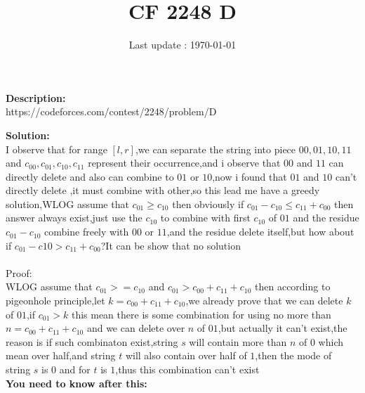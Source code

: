 \documentclass{article}
\begin{document}
\title{\textbf{CF 2248 D}}
\author{}
\date{Last update : \today}

\maketitle

\noindent \textbf{Description:}\\
https://codeforces.com/contest/2248/problem/D

\noindent \textbf{Solution:}\\
I observe that for range $[l,r]$,we can separate the string into piece $00,01,10,11$ and $c_{00},c_{01},c_{10},c_{11}$ represent their occurrence,and i observe that $00$ and $11$ can directly delete and also can combine to $01$ or $10$,now i found that $01$ and $10$ can't directly delete ,it must combine with other,so this lead me have a greedy solution,WLOG assume that $c_{01}\ge c_{10}$ then obviously if $c_{01}-c_{10}\le c_{11}+c_{00}$ then answer always exist,just use the $c_{10}$ to combine with first $c_{10}$ of $01$ and the residue $c_{01}-c_{10}$ combine freely with $00\text{ or }11$,and the residue delete itself,but how about if $c_{01}-c{10}>c_{11}+c_{00}$?It can be show that no solution\\
\\
Proof:\\
WLOG assume that $c_{01}>=c_{10}$ and $c_{01}>c_{00}+c_{11}+c_{10}$ then according to pigeonhole principle,let $k=c_{00}+c_{11}+c_{10}$,we already prove that we can delete $k$ of $01$,if $c_{01}>k$ this mean there is some combination for using no more than $n=c_{00}+c_{11}+c_{10}$ and we can delete over $n$ of $01$,but actually it can't exist,the reason is if such combinaton exist,string $s$ will contain more than $n$ of $0$ which mean over half,and string $t$ will also contain over half of $1$,then the mode of string $s$ is $0$ and for $t$ is $1$,thus this combination can't exist
\\
\noindent \textbf{You need to know after this:}\\
\end{document}
